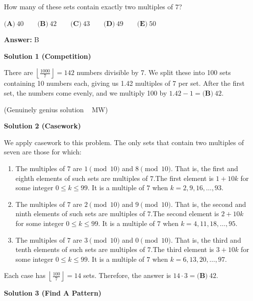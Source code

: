 \begin{enumerate}
How many of these sets contain exactly two multiples of $7$?


 $\textbf{(A)}\ 40\qquad\textbf{(B)}\ 42\qquad\textbf{(C)}\ 43\qquad\textbf{(D)}\ 49\qquad\textbf{(E)}\ 50$

 \textbf{Answer: }B



\textbf{Solution 1 (Competition)}

There are $\left\lfloor \frac{1000}{7} \right\rfloor = 142$ numbers divisible by 7. We split these into 100 sets containing 10 numbers each, giving us 1.42 multiples of 7 per set. After the first set, the numbers come evenly, and we multiply 100 by $1.42 - 1 = \boxed{\textbf{(B)}\ 42}.$

 (Genuinely genius solution ~ MW)

 



\textbf{Solution 2 (Casework)}

We apply casework to this problem. The only sets that contain two multiples of seven are those for which:

 
            \begin{enumerate} 
        \item The multiples of $7$ are $1\pmod{10}$ and $8\pmod{10}.$ That is, the first and eighth elements of such sets are multiples of $7.$The first element is $1+10k$ for some integer $0\leq k\leq99.$ It is a multiple of $7$ when $k=2,9,16,\ldots,93.$

        \item The multiples of $7$ are $2\pmod{10}$ and $9\pmod{10}.$ That is, the second and ninth elements of such sets are multiples of $7.$The second element is $2+10k$ for some integer $0\leq k\leq99.$ It is a multiple of $7$ when $k=4,11,18,\ldots,95.$

        \item The multiples of $7$ are $3\pmod{10}$ and $0\pmod{10}.$ That is, the third and tenth elements of such sets are multiples of $7.$The third element is $3+10k$ for some integer $0\leq k\leq99.$ It is a multiple of $7$ when $k=6,13,20,\ldots,97.$

            \end{enumerate}
            Each case has $\left\lfloor\frac{100}{7}\right\rfloor=14$ sets. Therefore, the answer is $14\cdot3=\boxed{\textbf{(B)}\ 42}.$




\textbf{Solution 3 (Find A Pattern)}


\end{enumerate}
